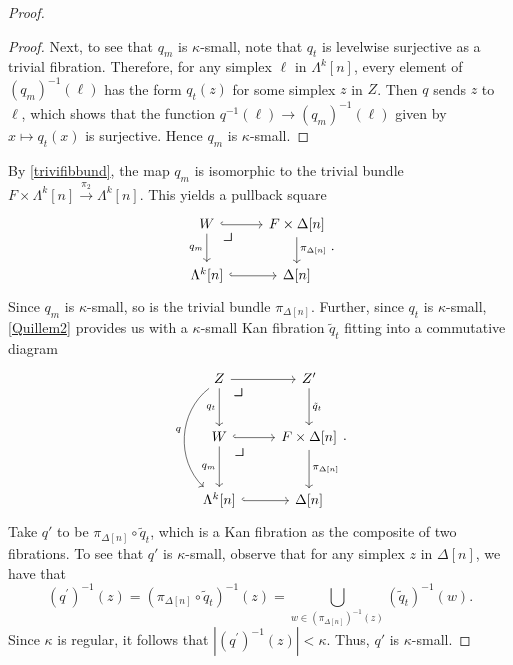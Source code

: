 \documentclass[10pt,letterpaper,cm]{nupset}
\theoremstyle{definition}
\theoremstyle{theorem}
\theoremstyle{remark}
\newcommand{\0}{\mathbf{0}}
\newcommand{\1}{\mathbf{1}}
\newcommand{\2}{\mathbf{2}}
\begin{document}
\begin{proof}
\begin{proof}
\medskip

Next, to see that $q_m$ is $\kappa$-small, note that $q_t$ is levelwise surjective as a trivial fibration. Therefore, for any simplex $\ell$ in $\Lambda^k[n]$, every element of $\left(q_m\right)^{-1}(\ell)$ has the form $q_t(z)$ for some simplex $z$ in $Z$. Then $q$ sends $z$ to $\ell$, which shows that the function $q^{-1}(\ell) \to   \left(q_m\right)^{-1}(\ell)$ given by $x\mapsto q_t(x)$ is surjective. Hence $q_m$ is $\kappa$-small.
\end{proof}
By \cref{trivifibbund}, the map $q_m$ is isomorphic to the trivial bundle $F \times \Lambda^k[n] \overset{\pi_2}{\longrightarrow} \Lambda^k[n]$. This yields a pullback square
\[
\begin{tikzcd}
W \arrow[d, "q_m"'] \arrow[r, hook] 
\arrow[dr, phantom, "\scalebox{1.5}{\color{black}$\lrcorner$}" , very near start, color=black]
& {F\times \Delta[n]} \arrow[d, "\pi_{\Delta[n]}"] \\
{\Lambda^k[n]} \arrow[r, hook]         & {\Delta[n]}                           
\end{tikzcd}
.\] Since $q_m$ is $\kappa$-small, so is the trivial bundle $\pi_{\Delta[n]}$. Further, since $q_t$ is $\kappa$-small,  \cref{Quillem2} provides us with  a $\kappa$-small Kan fibration $\tilde{q}_t$ fitting into a commutative diagram
\[
\begin{tikzcd}[row sep=large]
Z \arrow[d, "q_t"'] \arrow[r] \arrow[dd, "q"', bend right=49] 
\arrow[dr, phantom, "\scalebox{1.5}{\color{black}$\lrcorner$}" , very near start, color=black]
& Z' \arrow[d, "\tilde{q}_t"]            \\
W \arrow[d, "q_m"'] \arrow[r, hook]              
\arrow[dr, phantom, "\scalebox{1.5}{\color{black}$\lrcorner$}" , very near start, color=black]
             & {F\times \Delta[n]} \arrow[d, "\pi_{\Delta[n]}"] \\
{\Lambda^k[n]} \arrow[r, hook]                                & {\Delta[n]}                           
\end{tikzcd}
.\]
Take $q'$ to be $\pi_{\Delta[n]} \circ \tilde{q}_t$, which is a Kan fibration as the composite of two fibrations. To see that $q'$ is $\kappa$-small, observe that for any simplex $z$ in $\Delta[n]$, we have that
\[
\left(q^{\prime}\right)^{-1}\left(z\right)=\left(\pi_{\Delta[n]} \circ \tilde{q}_t\right)^{-1}\left(z\right)=\bigcup_{w \in\left(\pi_{\Delta[n]}\right)^{-1}\left(z\right)}\left(\tilde{q}_{t}\right)^{-1}\left(w\right)
.\] Since $\kappa$ is regular, it follows that $\left\lvert{\left(q^{\prime}\right)^{-1}\left(z\right)}\right\rvert < \kappa$. Thus, $q'$ is $\kappa$-small.


\end{proof}
\end{document}
